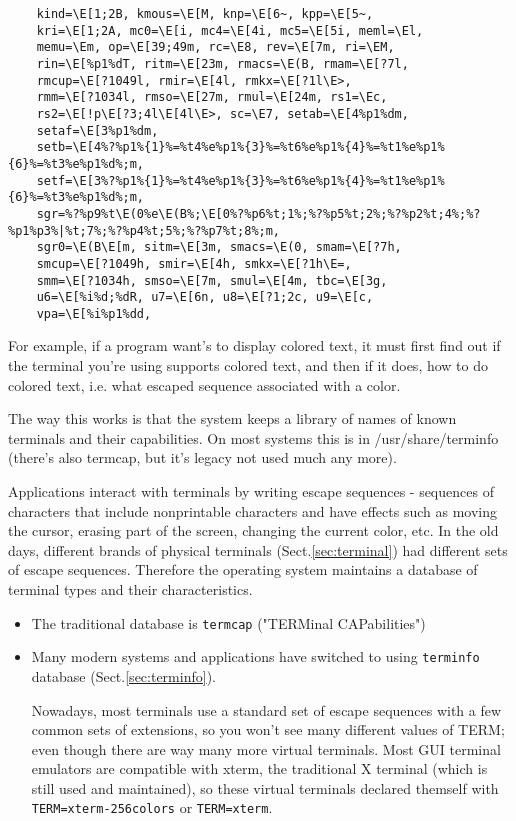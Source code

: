 {\begin{verbatim}
	kind=\E[1;2B, kmous=\E[M, knp=\E[6~, kpp=\E[5~,
	kri=\E[1;2A, mc0=\E[i, mc4=\E[4i, mc5=\E[5i, meml=\El,
	memu=\Em, op=\E[39;49m, rc=\E8, rev=\E[7m, ri=\EM,
	rin=\E[%p1%dT, ritm=\E[23m, rmacs=\E(B, rmam=\E[?7l,
	rmcup=\E[?1049l, rmir=\E[4l, rmkx=\E[?1l\E>,
	rmm=\E[?1034l, rmso=\E[27m, rmul=\E[24m, rs1=\Ec,
	rs2=\E[!p\E[?3;4l\E[4l\E>, sc=\E7, setab=\E[4%p1%dm,
	setaf=\E[3%p1%dm,
	setb=\E[4%?%p1%{1}%=%t4%e%p1%{3}%=%t6%e%p1%{4}%=%t1%e%p1%{6}%=%t3%e%p1%d%;m,
	setf=\E[3%?%p1%{1}%=%t4%e%p1%{3}%=%t6%e%p1%{4}%=%t1%e%p1%{6}%=%t3%e%p1%d%;m,
	sgr=%?%p9%t\E(0%e\E(B%;\E[0%?%p6%t;1%;%?%p5%t;2%;%?%p2%t;4%;%?%p1%p3%|%t;7%;%?%p4%t;5%;%?%p7%t;8%;m,
	sgr0=\E(B\E[m, sitm=\E[3m, smacs=\E(0, smam=\E[?7h,
	smcup=\E[?1049h, smir=\E[4h, smkx=\E[?1h\E=,
	smm=\E[?1034h, smso=\E[7m, smul=\E[4m, tbc=\E[3g,
	u6=\E[%i%d;%dR, u7=\E[6n, u8=\E[?1;2c, u9=\E[c,
	vpa=\E[%i%p1%dd,
\end{verbatim}
}
For example, if a program want's to display colored text, it must first find out
if the terminal you're using supports colored text, and then if it does, how to
do colored text, i.e. what escaped sequence associated with a color.  


The way this works is that the system keeps a library of names of known
terminals and their capabilities. On most systems this is in /usr/share/terminfo
(there's also termcap, but it's legacy not used much any more).

\begin{mdframed}

\label{sec:termcap}

Applications interact with terminals by writing escape sequences  -  sequences
of characters that include nonprintable characters and have effects such as
moving the cursor, erasing part of the screen, changing the current color, etc.
In the old days, different brands of physical terminals
(Sect.\ref{sec:terminal}) had different sets of escape sequences. Therefore the
operating system maintains a database of terminal types and their
characteristics.
\begin{itemize}
  \item  The traditional database is \verb!termcap! ("TERMinal CAPabilities")

  \item Many modern systems and applications have switched to using
  \verb!terminfo! database (Sect.\ref{sec:terminfo}). 
  
  Nowadays, most terminals use a standard set of escape sequences with a
few common sets of extensions, so you won't see many different values of TERM;
even though there are way many more virtual terminals. Most GUI terminal
emulators are compatible with xterm, the traditional X terminal (which is still
used and maintained), so these virtual terminals declared themself with
\verb!TERM=xterm-256colors! or \verb!TERM=xterm!.
\end{itemize}

\end{mdframed}  

